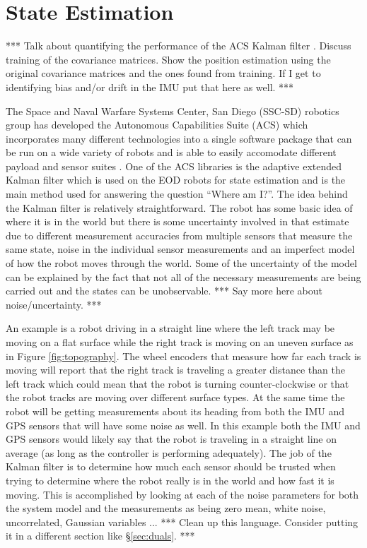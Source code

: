 \chapter{State Estimation}
\label{ch:estimation}
*** Talk about quantifying the performance of the ACS Kalman filter \cite{Sights06}. Discuss training of the covariance matrices. Show the position estimation using the original covariance matrices and the ones found from training. If I get to identifying bias and/or drift in the IMU put that here as well. ***

The Space and Naval Warfare Systems Center, San Diego (SSC-SD) robotics group has developed the Autonomous Capabilities Suite (ACS) which incorporates many different technologies into a single software package that can be run on a wide variety of robots and is able to easily accomodate different payload and sensor suites \cite{Sights06}. One of the ACS libraries is the adaptive extended Kalman filter which is used on the EOD robots for state estimation and is the main method used for answering the question ``Where am I?''. The idea behind the Kalman filter is relatively straightforward. The robot has some basic idea of where it is in the world but there is some uncertainty involved in that estimate due to different measurement accuracies from multiple sensors that measure the same state, noise in the individual sensor measurements and an imperfect model of how the robot moves through the world. Some of the uncertainty of the model can be explained by the fact that not all of the necessary measurements are being carried out and the states can be unobservable. *** Say more here about noise/uncertainty. ***

An example is a robot driving in a straight line where the left track may be moving on a flat surface while the right track is moving on an uneven surface as in Figure \ref{fig:topography}. The wheel encoders that measure how far each track is moving will report that the right track is traveling a greater distance than the left track which could mean that the robot is turning counter-clockwise or that the robot tracks are moving over different surface types. At the same time the robot will be getting measurements about its heading from both the IMU and GPS sensors that will have some noise as well. In this example both the IMU and GPS sensors would likely say that the robot is traveling in a straight line on average (as long as the controller is performing adequately). The job of the Kalman filter is to determine how much each sensor should be trusted when trying to determine where the robot really is in the world and how fast it is moving. This is accomplished by looking at each of the noise parameters for both the system model and the measurements as being zero mean, white noise, uncorrelated, Gaussian variables ... *** Clean up this language. Consider putting it in a different section like \S\ref{sec:duals}. ***


